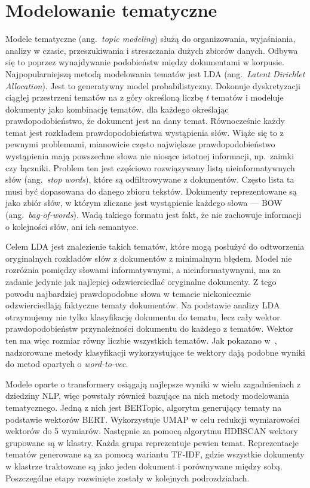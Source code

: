
\chapter{Modelowanie tematyczne}\label{sec:topic_modeling}
	Modele tematyczne (ang.\ \emph{topic modeling}) służą do organizowania, wyjaśniania, analizy w czasie, przeszukiwania i streszczania dużych zbiorów danych.
	Odbywa się to poprzez wynajdywanie podobieństw między dokumentami w korpusie.
	Najpopularniejszą metodą modelowania tematów jest LDA (ang.\ \emph{Latent Dirichlet Allocation})\cite{LDA}.
	Jest to generatywny model probabilistyczny.
	Dokonuje dyskretyzacji ciągłej przestrzeni tematów na z góry określoną liczbę \emph{t} tematów
		i modeluje dokumenty jako kombinację tematów, dla każdego określając prawdopodobieństwo, że dokument jest na dany temat.
	Równocześnie każdy temat jest rozkładem prawdopodobieństwa wystąpienia słów.
	Wiąże się to z pewnymi problemami, mianowicie często największe prawdopodobieństwo wystąpienia mają powszechne słowa nie niosące istotnej informacji, np.\ zaimki czy łączniki.
	Problem ten jest częściowo rozwiązywany listą nieinformatywnych słów (ang.\ \emph{stop words}), które są odfiltrowywane z dokumentów.
	Często lista ta musi być dopasowana do danego zbioru tekstów.
	Dokumenty reprezentowane są jako zbiór słów, w którym zliczane jest wystąpienie każdego słowa --- BOW (ang.\ \emph{bag-of-words}).
	Wadą takiego formatu jest fakt, że nie zachowuje informacji o kolejności słów, ani ich semantyce.

	Celem LDA jest znalezienie takich tematów, które mogą posłużyć do odtworzenia oryginalnych rozkładów słów z dokumentów z minimalnym błędem.
	Model nie rozróżnia pomiędzy słowami informatywnymi, a nieinformatywnymi, ma za zadanie jedynie jak najlepiej odzwierciedlać oryginalne dokumenty.
	Z tego powodu najbardziej prawdopodobne słowa w temacie niekoniecznie odzwierciedlają faktyczne tematy dokumentów.
	Na podstawie analizy LDA otrzymujemy nie tylko klasyfikację dokumentu do tematu, lecz cały wektor prawdopodobieństw przynależności dokumentu do każdego z tematów.
	Wektor ten ma więc rozmiar równy liczbie wszystkich tematów.
	Jak pokazano w~\cite{BoW_PL}, nadzorowane metody klasyfikacji wykorzystujące te wektory dają podobne wyniki do metod opartych o \emph{word-to-vec}.

	Modele oparte o transformery osiągają najlepsze wyniki w wielu zagadnieniach z dziedziny NLP\cite{KLEJ},
		więc powstały również bazujące na nich metody modelowania tematycznego.
	Jedną z nich jest BERTopic\cite{BERTopic}, algorytm generujący tematy na podstawie wektorów BERT\@.
	Wykorzystuje UMAP\cite{UMAP} w celu redukcji wymiarowości wektorów do 5 wymiarów.
	Następnie za pomocą algorytmu HDBSCAN\cite{HDBSCAN} wektory grupowane są w klastry.
	Każda grupa reprezentuje pewien temat.
	Reprezentacje tematów generowane są za pomocą wariantu TF-IDF\@,
		gdzie wszystkie dokumenty w klastrze traktowane są jako jeden dokument i porównywane między sobą.
	Poszczególne etapy rozwinięte zostały w kolejnych podrozdziałach.

